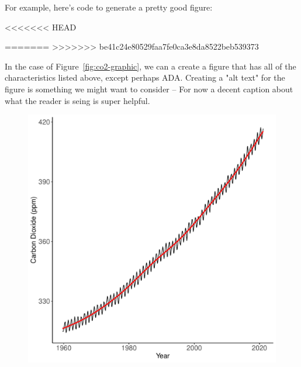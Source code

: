 \documentclass{book}\usepackage{knitr}
\begin{document}
For example, here's code to generate a pretty good figure: 



<<<<<<< HEAD
\begin{knitrout}
\color{fgcolor}\begin{kframe}


{\ttfamily\noindent\bfseries{}}

{\ttfamily\noindent\bfseries\color{errorcolor}{\#\# Error in createDataPartition(., p = 0.8, list = FALSE): object 'maunaloa' not found}}

{\ttfamily\noindent\bfseries\color{errorcolor}{\#\# Error in eval(expr, envir, enclos): object 'maunaloa' not found}}

{\ttfamily\noindent\bfseries\color{errorcolor}{\#\# Error in eval(expr, envir, enclos): object 'maunaloa' not found}}
=======
>>>>>>> be41c24e80529faa7fe0ca3e8da8522beb539373


In the case of Figure~\ref{fig:co2-graphic}, we can a create a figure that has all of the characteristics listed above, except perhaps ADA. Creating a "alt text" for the figure is something we might want to consider -- For now a decent caption about what the reader is seing is super helpful. 

\begin{figure}
\begin{knitrout}
\color{fgcolor}
\includegraphics[width=\maxwidth]{figure/maunaloa-1} 


\end{knitrout}
\end{figure}
\end{kframe}
\end{knitrout}
\end{document}

